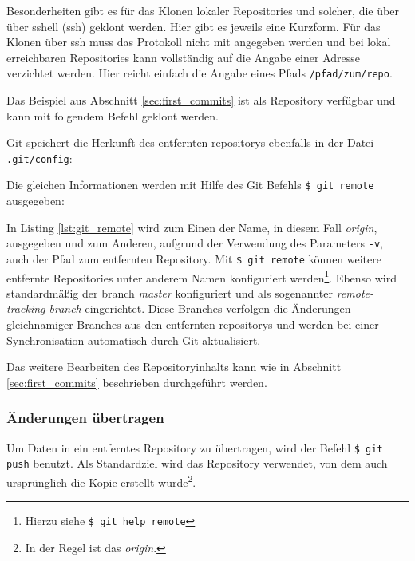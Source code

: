 
Besonderheiten gibt es für das Klonen lokaler Repositories und solcher, die über
über \gls{sshell} (\acrshort{ssh}) geklont werden. Hier gibt es jeweils eine
Kurzform. Für das Klonen über \acrshort{ssh} muss das Protokoll nicht mit
angegeben werden und bei lokal erreichbaren Repositories kann vollständig auf
die Angabe einer Adresse verzichtet werden. Hier reicht einfach die Angabe
eines Pfads \texttt{/pfad/zum/repo}.

Das Beispiel aus Abschnitt \ref{sec:first_commits} ist als
Repository verfügbar und kann mit folgendem Befehl geklont werden.


Git speichert die Herkunft des entfernten \glspl{repository} ebenfalls in der
Datei \texttt{.git/config}:


Die gleichen Informationen werden mit Hilfe des Git Befehls \texttt{\$ git
remote} ausgegeben:


In Listing \ref{lst:git_remote} wird zum Einen der Name, in diesem Fall
\textit{origin}, ausgegeben und zum Anderen, aufgrund der Verwendung des
Parameters \texttt{-v}, auch der Pfad zum entfernten Repository. Mit \texttt{\$
git remote} können weitere entfernte Repositories unter anderem Namen
konfiguriert werden\footnote{Hierzu siehe \texttt{\$ git help remote}}. Ebenso
wird standardmäßig der \gls{branch} \textit{master} konfiguriert und als
sogenannter \textit{remote-tracking-branch} eingerichtet. Diese Branches verfolgen
die Änderungen gleichnamiger Branches aus den entfernten \glspl{repository}
und werden bei einer Synchronisation automatisch durch Git
aktualisiert. \cite[S.~141-143]{gitosp}

Das weitere Bearbeiten des Repositoryinhalts kann wie in Abschnitt
\ref{sec:first_commits} beschrieben durchgeführt werden.

\subsubsection{Änderungen übertragen}\label{sec:pushchanges}
Um Daten in ein entferntes Repository zu übertragen, wird der Befehl \texttt{\$
git push} benutzt. Als Standardziel wird das Repository verwendet, von dem auch
ursprünglich die Kopie erstellt wurde\footnote{In der Regel ist das \textit{origin}.}.

